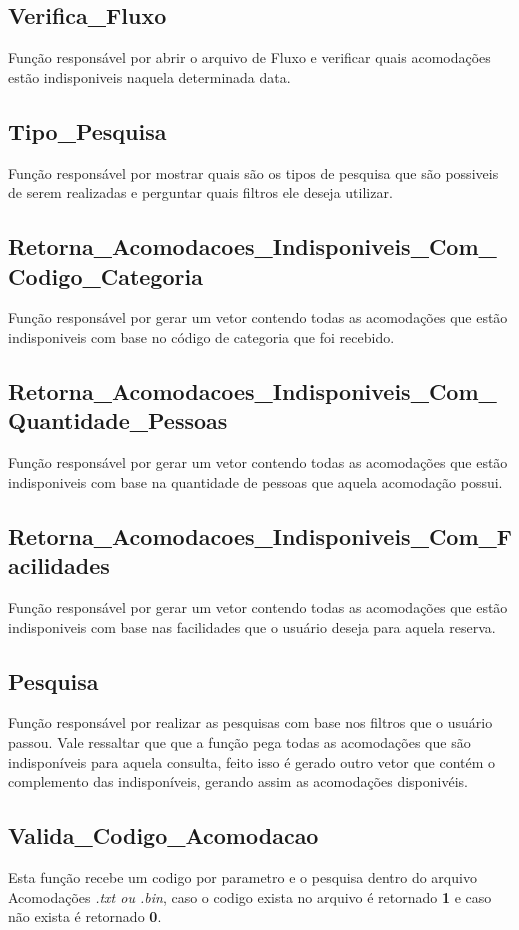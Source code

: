 \documentclass{article}
\begin{document}
\subsection{Verifica\_Fluxo}
	Função responsável por abrir o arquivo de Fluxo e verificar quais acomodações estão indisponiveis naquela determinada data.

\subsection{Tipo\_Pesquisa}
	Função responsável por mostrar quais são os tipos de pesquisa que são possiveis de serem realizadas e perguntar quais filtros ele deseja utilizar.

\subsection{Retorna\_Acomodacoes\_Indisponiveis\_Com\_Codigo\_Categoria}
	Função responsável por gerar um vetor contendo todas as acomodações que estão indisponiveis com base no código de categoria que foi recebido.

\subsection{Retorna\_Acomodacoes\_Indisponiveis\_Com\_Quantidade\_Pessoas}
	Função responsável por gerar um vetor contendo todas as acomodações que estão indisponiveis com base na quantidade de pessoas que aquela acomodação possui.

\subsection{Retorna\_Acomodacoes\_Indisponiveis\_Com\_Facilidades}
	Função responsável por gerar um vetor contendo todas as acomodações que estão indisponiveis com base nas facilidades que o usuário deseja para aquela reserva.

\subsection{Pesquisa}
	Função responsável por realizar as pesquisas com base nos filtros que o usuário passou. Vale ressaltar que que a função pega todas as acomodações que são indisponíveis para aquela consulta, feito isso é  gerado outro vetor que contém o complemento das indisponíveis, gerando assim as acomodações disponivéis.

\subsection{Valida\_Codigo\_Acomodacao}
	Esta função recebe um codigo por parametro e o pesquisa dentro do arquivo Acomodações \textit{.txt ou .bin}, caso o codigo exista no arquivo é retornado \textbf{1} e caso não exista é retornado  \textbf{0}.
\end{document}
